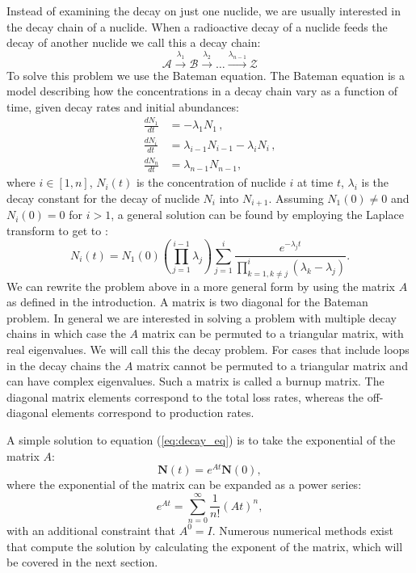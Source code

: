 \documentclass[10pt]{article}
\begin{document}
Instead of examining the decay on just one nuclide, we are usually interested in the decay chain of a nuclide. When a radioactive decay of a nuclide feeds the decay of another nuclide we call this a decay chain:
\begin{equation*}
    \mathcal{A} \xrightarrow{\lambda_{1}} \mathcal{B} \xrightarrow{\lambda_{2}} \dots \xrightarrow{\lambda_{n-1}} \mathcal{Z}
\end{equation*}
To solve this problem we use the Bateman equation. The Bateman equation is a model describing how the concentrations in a decay chain vary as a function of time, given decay rates and initial abundances:
\begin{align*}
    \frac{dN_{1}}{dt} &= - \lambda_{1} N_{1}  \,,\\
    \frac{dN_{i}}{dt} &= \lambda_{i-1} N_{i-1} - \lambda_{i} N_{i}\,,\\
    \frac{dN_{n}}{dt} &= \lambda_{n-1} N_{n-1},
\end{align*}
where $i \in [1, n]$, $N_i(t)$ is the concentration of nuclide $i$ at time $t$, $\lambda_i$ is the decay constant for the decay of nuclide $N_i$ into $N_{i+1}$. Assuming $N_1(0) \neq 0$ and $N_i(0) = 0$ for $i > 1$, a general solution can be found by employing the Laplace transform to get to \cite{cit:sol_decay_eq}:
\begin{equation*}
    N_i(t) = N_1(0) \left(\prod_{j=1}^{i-1}\lambda_j\right) \sum_{j=1}^i \frac{e^{-\lambda_j t}}{\prod^i_{k=1, k\neq j} (\lambda_k-\lambda_j)}.
\end{equation*}
We can rewrite the problem above in a more general form by using the matrix $A$ as defined in the introduction. A matrix is two diagonal for the Bateman problem. In general we are interested in solving a problem with multiple decay chains in which case the $A$ matrix can be permuted to a triangular matrix, with real eigenvalues. We will call this the decay problem. For cases that include loops in the decay chains the $A$ matrix cannot be permuted to a triangular matrix and can have complex eigenvalues. Such a matrix is called a burnup matrix. The diagonal matrix elements correspond to the total loss rates, whereas the off-diagonal elements correspond to production rates.

A simple solution to equation (\ref{eq:decay_eq}) is to take the exponential of the matrix $A$:
\begin{equation*}
    \mathbf{N}(t) = e^{At}\mathbf{N}(0),
\end{equation*}
where the exponential of the matrix can be expanded as a power series:
\begin{equation*}
    e^{At} = \sum_{n=0}^\infty \frac{1}{n!}(At)^n,
\end{equation*}
with an additional constraint that $A^0 = I$. Numerous numerical methods exist that compute the solution by calculating the exponent of the matrix, which will be covered in the next section.
\end{document}
